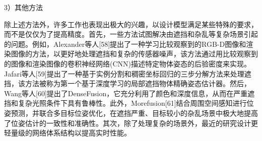 \documentclass[12pt]{article}
\begin{document}
3）其他方法

除上述方法外，许多工作也表现出极大的兴趣，以设计模型满足某些特殊的要求，而不是仅仅为了提高精度。首先，一些方法试图解决由遮挡和杂乱等复杂场景引起的问题。例如，Alexander等人[58]提出了一种学习比较观察到的RGB-D图像和渲染图像的方法，以更好地处理遮挡和复杂的传感器噪声，该方法通过用比较观察到的图像和渲染图像的卷积神经网络(CNN)描述特定物体姿态的后验密度来实现。Jafari等人[59]提出了一种基于实例分割和稠密坐标回归的三步分解方法来处理遮挡，该方法被称为第一个基于深度学习的局部遮挡物体精确姿态估计器。然后，Wang等人[60]提出了DenseFusion，它充分利用了颜色和深度信息，从而在严重遮挡和复杂光照条件下具有鲁棒性。此外，Morefusion[61]结合周围空间感知进行位姿预测，并联合多目标位姿优化，在遮挡严重、目标较小的杂乱场景中极大地提高了位姿估计的一致性和准确性。其次，除了处理复杂的场景外，最近的研究设计更轻量级的网络体系结构以提高实时性能。





\end{document}
